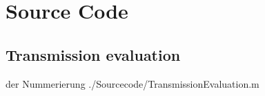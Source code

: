 \chapter{Source Code}
\label{appendixSoureCode}

\newpage
\section{Transmission evaluation}
%
 der Nummerierung 
		{./Sourcecode/TransmissionEvaluation.m} %
		
